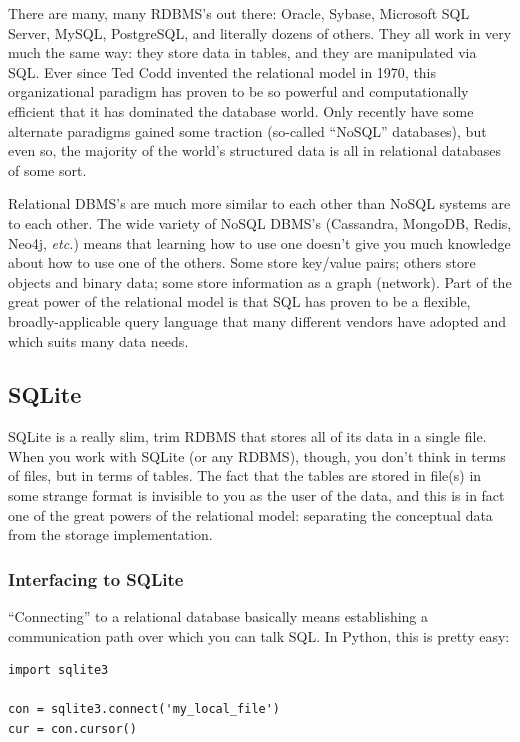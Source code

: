 \documentclass[12pt]{article}
\begin{document}
There are many, many RDBMS's out there: Oracle, Sybase, Microsoft SQL Server,
MySQL, PostgreSQL, and literally dozens of others. They all work in very much
the same way: they store data in tables, and they are manipulated via SQL.
Ever since Ted Codd invented the relational model in 1970, this organizational
paradigm has proven to be so powerful and computationally efficient that it
has dominated the database world. Only recently have some alternate paradigms
gained some traction (so-called ``NoSQL'' databases), but even so, the majority
of the world's structured data is all in relational databases of some sort.

Relational DBMS's are much more similar to each other than NoSQL systems are
to each other. The wide variety of NoSQL DBMS's (Cassandra, MongoDB, Redis,
Neo4j, \textit{etc.}) means that learning how to use one doesn't give you much
knowledge about how to use one of the others. Some store key/value pairs;
others store objects and binary data; some store information as a graph
(network). Part of the great power of the relational model is that SQL has
proven to be a flexible, broadly-applicable query language that many different
vendors have adopted and which suits many data needs.

\subsection{SQLite}

SQLite is a really slim, trim RDBMS that stores all of its data in a single
file. When you work with SQLite (or any RDBMS), though, you don't think in
terms of files, but in terms of tables. The fact that the tables are stored in
file(s) in some strange format is invisible to you as the user of the data,
and this is in fact one of the great powers of the relational model:
separating the conceptual data from the storage implementation.

\subsubsection{Interfacing to SQLite}

``Connecting'' to a relational database basically means establishing a
communication path over which you can talk SQL. In Python, this is pretty
easy:

\begin{Verbatim}[fontsize=\small,samepage=true,frame=none]
import sqlite3

con = sqlite3.connect('my_local_file')
cur = con.cursor()
\end{Verbatim}
\end{document}
